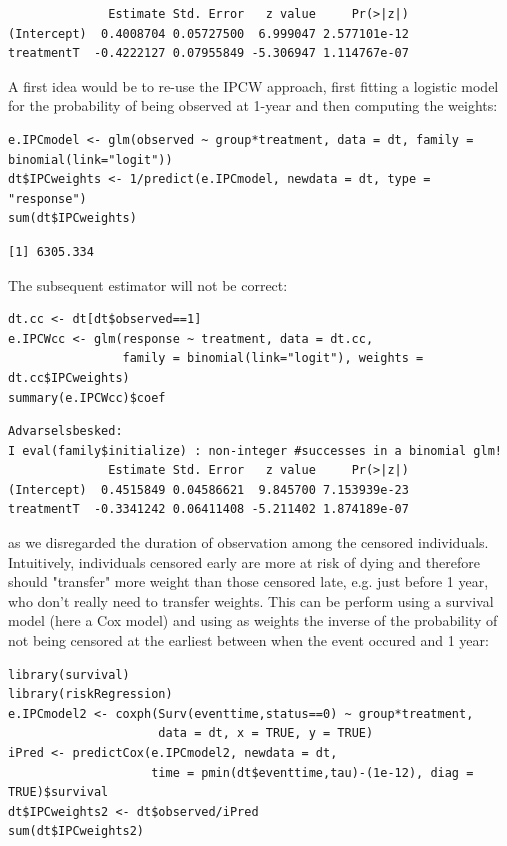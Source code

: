 \documentclass[12pt]{article}
\begin{document}
\begin{verbatim}
              Estimate Std. Error   z value     Pr(>|z|)
(Intercept)  0.4008704 0.05727500  6.999047 2.577101e-12
treatmentT  -0.4222127 0.07955849 -5.306947 1.114767e-07
\end{verbatim}


A first idea would be to re-use the IPCW approach, first fitting a
logistic model for the probability of being observed at 1-year and
then computing the weights:
\lstset{language=r,label= ,caption= ,captionpos=b,numbers=none}
\begin{lstlisting}
e.IPCmodel <- glm(observed ~ group*treatment, data = dt, family = binomial(link="logit"))
dt$IPCweights <- 1/predict(e.IPCmodel, newdata = dt, type = "response")
sum(dt$IPCweights)
\end{lstlisting}

\begin{verbatim}
[1] 6305.334
\end{verbatim}


The subsequent estimator will not be correct: 
\lstset{language=r,label= ,caption= ,captionpos=b,numbers=none}
\begin{lstlisting}
dt.cc <- dt[dt$observed==1]
e.IPCWcc <- glm(response ~ treatment, data = dt.cc,
                family = binomial(link="logit"), weights = dt.cc$IPCweights)
summary(e.IPCWcc)$coef
\end{lstlisting}

\begin{verbatim}
Advarselsbesked:
I eval(family$initialize) : non-integer #successes in a binomial glm!
              Estimate Std. Error   z value     Pr(>|z|)
(Intercept)  0.4515849 0.04586621  9.845700 7.153939e-23
treatmentT  -0.3341242 0.06411408 -5.211402 1.874189e-07
\end{verbatim}


as we disregarded the duration of observation among the censored
individuals. Intuitively, individuals censored early are more at risk
of dying and therefore should "transfer" more weight than those
censored late, e.g. just before 1 year, who don't really need to
transfer weights. This can be perform using a survival model (here a
Cox model) and using as weights the inverse of the probability of not
being censored at the earliest between when the event occured and 1
year:
\lstset{language=r,label= ,caption= ,captionpos=b,numbers=none}
\begin{lstlisting}
library(survival)
library(riskRegression)
e.IPCmodel2 <- coxph(Surv(eventtime,status==0) ~ group*treatment,
                     data = dt, x = TRUE, y = TRUE)
iPred <- predictCox(e.IPCmodel2, newdata = dt,
                    time = pmin(dt$eventtime,tau)-(1e-12), diag = TRUE)$survival
dt$IPCweights2 <- dt$observed/iPred
sum(dt$IPCweights2)
\end{lstlisting}
\end{document}
